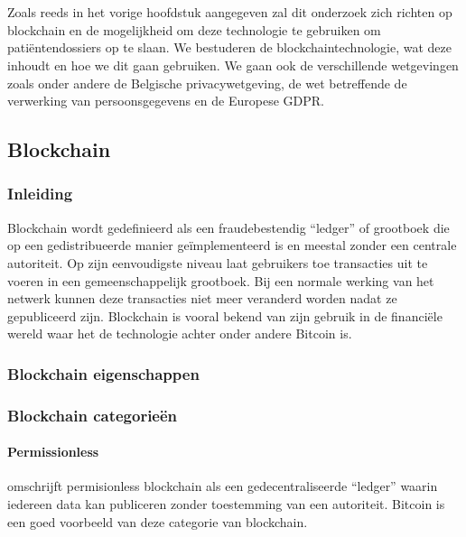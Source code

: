 \chapter{}
\label{ch:stand-van-zaken}

Zoals reeds in het vorige hoofdstuk aangegeven zal dit onderzoek zich richten op blockchain en de mogelijkheid om deze technologie te gebruiken om patiëntendossiers op te slaan. We bestuderen de blockchaintechnologie, wat deze inhoudt en hoe we dit gaan gebruiken. We gaan ook de verschillende wetgevingen zoals onder andere de Belgische privacywetgeving, de wet betreffende de verwerking van persoonsgegevens en de Europese GDPR.

\section{Blockchain}
\label{ch:blockchain} 

\subsection{Inleiding}

Blockchain wordt gedefinieerd als een fraudebestendig ``ledger'' of grootboek die op een gedistribueerde manier geïmplementeerd is en meestal zonder een centrale autoriteit. Op zijn eenvoudigste niveau laat gebruikers toe transacties uit te voeren in een gemeenschappelijk grootboek. Bij een normale werking van het netwerk kunnen deze transacties niet meer veranderd worden nadat ze gepubliceerd zijn. Blockchain is vooral bekend van zijn gebruik in de financiële wereld waar het de technologie achter onder andere Bitcoin is.\autocite{Yaga2018}

\subsection{Blockchain eigenschappen}

\subsection{Blockchain categorieën}

\subsubsection{Permissionless}

\textcite{Yaga2018} omschrijft permisionless blockchain als een gedecentraliseerde ``ledger'' waarin iedereen data kan publiceren zonder toestemming van een autoriteit. Bitcoin is een goed voorbeeld van deze categorie van blockchain.

